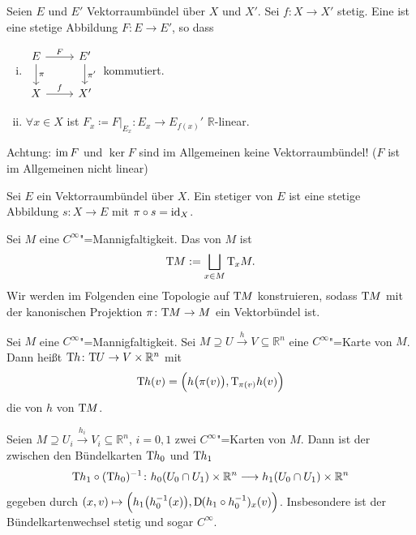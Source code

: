 \begin{definition}[{name=[Homomorphismus von Vektorraumbündeln]}]
	Seien $E$ und $E'$ Vektorraumbündel über $X$ und $X'$. 
	Sei $f \colon X \to X'$ stetig. 
	Eine  ist eine stetige Abbildung $F \colon E \to E'$, so dass 
	\begin{enumerate}[(i)]
		\item \(
			\begin{tikzcd}
				E \rar["F"] \dar["\pi"] & E' \dar["\pi'"]\\
				X \rar["f"] & X'
			\end{tikzcd}
		\)
		kommutiert.
		\item $\forall x \in X$ ist $F_x \coloneqq F \big|_{E_x} \colon E_x \to E_{f(x)}'$ $\mathbb{R}$-linear.
	\end{enumerate}
\end{definition}

Achtung: $\im F$ und $\ker F$ sind im Allgemeinen keine Vektorraumbündel! ($F$ ist im Allgemeinen nicht linear)

\begin{definition}[{name=[Schnitt]}]
	Sei $E$ ein Vektorraumbündel über $X$. 
	Ein stetiger  von $E$ ist eine stetige Abbildung $s \colon X \to E$ mit $\pi \circ s = \id_X$.
\end{definition}

\begin{definition}[{name=[Tangentialbündel]}]
	Sei $M$ eine $C^\infty$"=Mannigfaltigkeit. Das  von $M$ ist 
	\[
		\Tang M := \bigsqcup_{x \in M} \Tang_x M.
	\]
	Wir werden im Folgenden eine Topologie auf $\Tang M$ konstruieren, sodass $\Tang M$ mit der kanonischen Projektion $\pi \colon \Tang M \to M$ ein Vektorbündel ist.
\end{definition}

\begin{definition}[{name=[induzierte Bündelkarte]}]
	Sei $M$ eine $C^\infty$"=Mannigfaltigkeit. 
	Sei $M \supseteq U \xrightarrow{h} V \subseteq \mathbb{R}^n$ eine $C^\infty$"=Karte von $M$. 
	Dann heißt $\Tang h \colon \Tang U \to V \times \mathbb{R}^n$ mit 
	\[
		\Tang h (v) = \enbrace[\Big]{h \enbrace[\big]{\pi(v)}, \Tang_{\pi(v)} h (v)}  
	\]
	die von $h$  von $\Tang M$.
\end{definition}

\begin{bemerkung}[{name=[Bündelkartenwechsel]}]
	Seien $M \supseteq U_i \xrightarrow{h_i} V_i \subseteq \mathbb{R}^n $, $i=0,1$ zwei $C^\infty$"=Karten von $M$. 
	Dann ist der  zwischen den Bündelkarten $\Tang h_0$ und $\Tang h_1$
	\[
		\Tang h_1 \circ (\Tang h_0)^{-1} \colon h_0(U_0 \cap U_1) \times \mathbb{R}^n \longrightarrow h_1(U_0 \cap U_1) \times \mathbb{R}^n
	\]
	gegeben durch $(x,v) \mapsto \enbrace[\Big]{h_1 \enbrace*{h_0^{-1}(x)}, \D ( h_1 \circ h_0^{-1})_x (v)}$. 
	Insbesondere ist der Bündelkartenwechsel stetig und sogar $C^\infty$.
\end{bemerkung}

